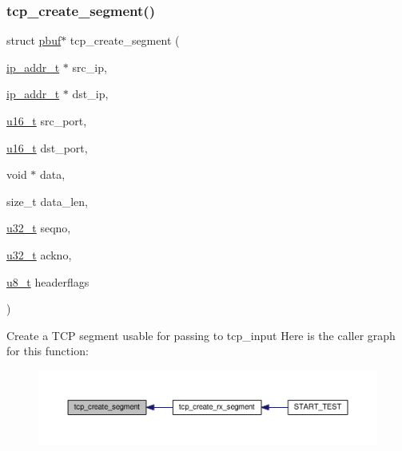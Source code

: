 \subsubsection{\texorpdfstring{tcp\+\_\+create\+\_\+segment()}{tcp\_create\_segment()}}
{\footnotesize\ttfamily struct \hyperlink{structpbuf}{pbuf}$\ast$ tcp\+\_\+create\+\_\+segment (\begin{DoxyParamCaption}\item[{\hyperlink{native_2lwip_2src_2include_2lwip_2ip__addr_8h_a88b43639738c4de2d3cd22e3a1fd7696}{ip\+\_\+addr\+\_\+t} $\ast$}]{src\+\_\+ip,  }\item[{\hyperlink{native_2lwip_2src_2include_2lwip_2ip__addr_8h_a88b43639738c4de2d3cd22e3a1fd7696}{ip\+\_\+addr\+\_\+t} $\ast$}]{dst\+\_\+ip,  }\item[{\hyperlink{group__compiler__abstraction_ga77570ac4fcab86864fa1916e55676da2}{u16\+\_\+t}}]{src\+\_\+port,  }\item[{\hyperlink{group__compiler__abstraction_ga77570ac4fcab86864fa1916e55676da2}{u16\+\_\+t}}]{dst\+\_\+port,  }\item[{void $\ast$}]{data,  }\item[{size\+\_\+t}]{data\+\_\+len,  }\item[{\hyperlink{group__compiler__abstraction_ga4c14294869aceba3ef9d4c0c302d0f33}{u32\+\_\+t}}]{seqno,  }\item[{\hyperlink{group__compiler__abstraction_ga4c14294869aceba3ef9d4c0c302d0f33}{u32\+\_\+t}}]{ackno,  }\item[{\hyperlink{group__compiler__abstraction_ga4caecabca98b43919dd11be1c0d4cd8e}{u8\+\_\+t}}]{headerflags }\end{DoxyParamCaption})}

Create a T\+CP segment usable for passing to tcp\+\_\+input Here is the caller graph for this function\+:
\nopagebreak
\begin{figure}[H]
\begin{center}
\leavevmode
\includegraphics[width=350pt]{openmote-cc2538_2lwip_2test_2unit_2tcp_2tcp__helper_8h_aa6f4b7b087e8641f6c178d8752cc4fab_icgraph}
\end{center}
\end{figure}
\mbox{\label{openmote-cc2538_2lwip_2test_2unit_2tcp_2tcp__helper_8h_ab5eb6956494f1deb9a97569d4b95ef6a}} 
